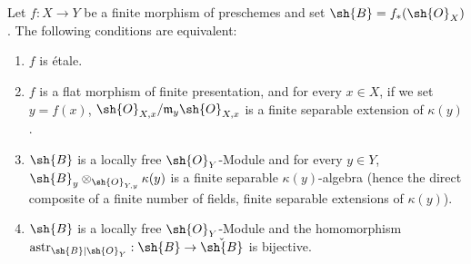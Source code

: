 \begin{proposition}[18.2.3]
\label{IV.18.2.3}
Let $f:X\to Y$ be a finite morphism of preschemes and set $\sh{B}=f_*(\sh{O}_X)$.
The following conditions are equivalent:
\begin{enumerate}[label=\emph{\alph*)}]
  \item $f$ is \'etale.
  \item[a$'$)] $f$ is a flat morphism of finite presentation, and for every $x\in X$, if we set $y=f(x)$, $\sh{O}_{X,x}/\mathfrak{m}_y\sh{O}_{X,x}$ is a finite separable extension of $\kappa(y)$.
  \item $\sh{B}$ is a locally free $\sh{O}_Y$-Module and for every $y\in Y$, $\sh{B}_y\otimes_{\sh{O}_{Y,y}}\kappa(y)$ is a finite separable $\kappa(y)$-algebra (hence the direct composite of a finite number of fields, finite separable extensions of $\kappa(y)$).
  \item $\sh{B}$ is a locally free $\sh{O}_Y$-Module and the homomorphism $\operatorname{astr}_{\sh{B}|\sh{O}_Y}:\sh{B}\to\check{\sh{B}}$  is bijective.
\end{enumerate}
\end{proposition}

